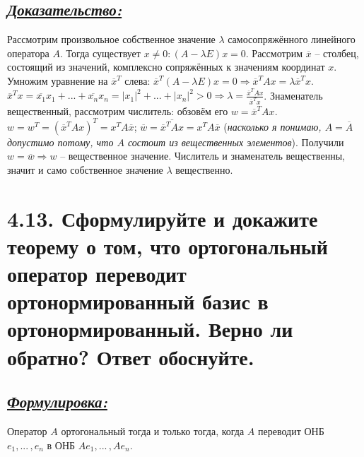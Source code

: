 \documentclass{article}
\begin{document}
\subsection*{\Large \underline{\textit{Доказательство: }}}
Рассмотрим произвольное собственное значение $\lambda$ самосопряжённого линейного оператора $A$. Тогда существует $x \ne 0 : (A - \lambda E)x = 0$. Рассмотрим $\overline{x}$ -- столбец, состоящий из значений, комплексно сопряжённых к значениям координат $x$. Умножим уравнение на $\overline{x}^T$ слева: $\overline{x}^T(A - \lambda E)x = 0 \Rightarrow \overline{x}^TAx = \lambda\overline{x}^Tx$. 
\newline $\overline{x}^Tx = \overline{x_1}x_1 + ... + \overline{x_n}x_n = |x_1|^2 + ... + |x_n|^2 > 0 \Rightarrow \boxed{\lambda = \frac{\overline{x}^TAx}{\overline{x}^Tx}}$. 
\newline Знаменатель вещественный, рассмотрим числитель: обзовём его $w = \overline{x}^TAx$. 
\newline $w = w^T = (\overline{x}^TAx)^T = x^TA\overline{x}$; $\overline{w} = \overline{\overline{x}^TAx} = x^TA\overline{x}$ (\textit{насколько я понимаю, $A = \overline{A}$ допустимо потому, что $A$ состоит из вещественных элементов}). Получили $w = \overline{w} \Rightarrow w$ -- вещественное значение. Числитель и знаменатель вещественны, значит и само собственное значение $\lambda$ вещественно.

\section*{\LARGE 4.13. Сформулируйте и докажите теорему о том, что ортогональный оператор переводит ортонормированный базис в ортонормированный. Верно ли обратно? Ответ обоснуйте.  }
\subsection*{\Large \underline{\textit{Формулировка: }}}
Оператор $A$ ортогональный тогда и только тогда, когда $A$ переводит ОНБ $e_1, ...\,, e_n$ в ОНБ $Ae_1, ...\,, Ae_n$.
\end{document}
